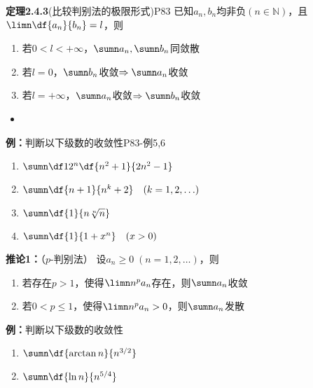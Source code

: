 \begin{frame}
	\linespread{1.2}\pause 
	\begin{block}{{\bf 定理2.4.3}(比较判别法的极限形式)\hfill P83}
		已知$a_n,b_n$均非负$(n\in\mathbb{N})$，且$\limn\df{a_n}{b_n}=l$，则\pause 
		\begin{enumerate}
		  \item 若$0<l<+\infty$，$\sumn a_n,\sumn b_n$同敛散\pause 
		  \item 若$l=0$，$\sumn b_n$收敛$\Rightarrow\sumn a_n$收敛\pause 
		  \item 若$l=+\infty$，$\sumn a_n$收敛$\Rightarrow\sumn b_n$收敛
		\end{enumerate}
	\end{block}
	\pause
	\begin{itemize}
	  \item {}
	\end{itemize}
\end{frame}

\begin{frame}
	\linespread{1.6}
	\begin{exampleblock}{{\bf 例：}判断以下级数的收敛性\hfill P83-例5,6}\pause 
		\begin{enumerate}
		  \item $\sumn\df 1{2^n}\df{n^2+1}{2n^2-1}$\pause 
		  \item $\sumn\df{n+1}{n^k+2}\quad (k=1,2,\ldots)$\pause 
		  \item $\sumn\df{1}{n\sqrt[n]{n}}$\pause 
		  \item $\sumn\df{1}{1+x^n}\quad(x>0)$
		\end{enumerate}
	\end{exampleblock}
\end{frame}

\begin{frame}
	\linespread{1.2}
	\begin{block}{{\bf 推论1：}（$p$-判别法）\hfill}\pause 
		设$a_n\geq 0\;(n=1,2,\ldots)$，则\pause 
		\begin{enumerate}
		  \item 若存在$p>1$，使得$\limn n^pa_n$存在，则$\sumn a_n$收敛\pause 
		  \item 若$0<p\leq 1$，使得$\limn n^pa_n>0$，则$\sumn a_n$发散
		\end{enumerate}
	\end{block}\pause 
	\begin{exampleblock}{{\bf 例：}判断以下级数的收敛性}
		\begin{enumerate}
		  \item $\sumn\df{\arctan n}{n^{3/2}}$\pause 
		  \item $\sumn\df{\ln n}{n^{5/4}}$
		\end{enumerate}
	\end{exampleblock}
\end{frame}


